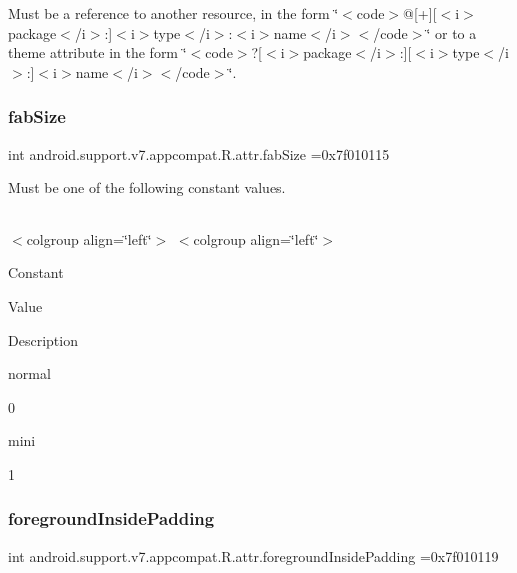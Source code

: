Must be a reference to another resource, in the form \char`\"{}$<$code$>$@\mbox{[}+\mbox{]}\mbox{[}$<$i$>$package$<$/i$>$\+:\mbox{]}$<$i$>$type$<$/i$>$\+:$<$i$>$name$<$/i$>$$<$/code$>$\char`\"{} or to a theme attribute in the form \char`\"{}$<$code$>$?\mbox{[}$<$i$>$package$<$/i$>$\+:\mbox{]}\mbox{[}$<$i$>$type$<$/i$>$\+:\mbox{]}$<$i$>$name$<$/i$>$$<$/code$>$\char`\"{}. \mbox{\label{classandroid_1_1support_1_1v7_1_1appcompat_1_1R_1_1attr_ac6e7b6a3e83161f81bc98d8589e3730f}} 
\subsubsection{\texorpdfstring{fab\+Size}{fabSize}}
{\footnotesize\ttfamily int android.\+support.\+v7.\+appcompat.\+R.\+attr.\+fab\+Size =0x7f010115\hspace{0.3cm}{\ttfamily [static]}}

Must be one of the following constant values.

\tabulinesep=1mm
\begin{longtabu} spread 0pt [c]{*{0}{|X[-1]}|}
\hline
\end{longtabu}
$<$colgroup align=\char`\"{}left\char`\"{}$>$ $<$colgroup align=\char`\"{}left\char`\"{}$>$ 

Constant

Value

Description 

{\ttfamily normal}

0

{\ttfamily mini}

1\mbox{\label{classandroid_1_1support_1_1v7_1_1appcompat_1_1R_1_1attr_ad76026ff556be723d0d119ea4fae113b}} 
\subsubsection{\texorpdfstring{foreground\+Inside\+Padding}{foregroundInsidePadding}}
{\footnotesize\ttfamily int android.\+support.\+v7.\+appcompat.\+R.\+attr.\+foreground\+Inside\+Padding =0x7f010119\hspace{0.3cm}{\ttfamily [static]}}

